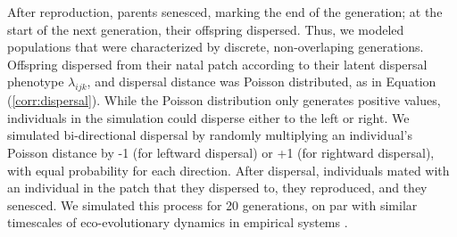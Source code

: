 After reproduction, parents senesced, marking the end of the generation; at the start of the next generation, their offspring dispersed. Thus, we modeled populations that were characterized by discrete, non-overlaping generations. Offspring dispersed from their natal patch according to their latent dispersal phenotype $\lambda_{ijk}$, and dispersal distance was Poisson distributed, as in Equation (\ref{corr:dispersal}). While the Poisson distribution only generates positive values, individuals in the simulation could disperse either to the left or right. We simulated bi-directional dispersal by randomly multiplying an individual's Poisson distance by -1 (for leftward dispersal) or +1 (for rightward dispersal), with equal probability for each direction. After dispersal, individuals mated with an individual in the patch that they dispersed to, they reproduced, and they senesced. We simulated this process for 20 generations, on par with similar timescales of eco-evolutionary dynamics in empirical systems \citep{williams_rapid_2016,ochocki_rapid_2017,weiss-lehman_rapid_2017}.

